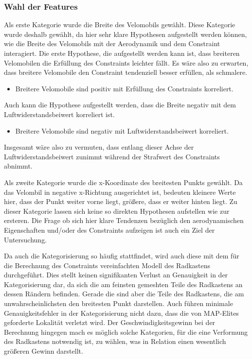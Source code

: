 \subsubsection{Wahl der Features}

Als erste Kategorie wurde die Breite des Velomobils gewählt.
Diese Kategorie wurde deshalb gewählt, da hier sehr klare Hypothesen aufgestellt werden können, wie die Breite des Velomobils mit der Aerodynamik und dem Constraint interagiert.
Die erste Hypothese, die aufgestellt werden kann ist, dass breiteren Velomobilen die Erfüllung des Constraints leichter fällt. Es wäre also zu erwarten, dass breitere Velomobile den Constraint tendenziell besser erfüllen, als schmalere.
\begin{itemize}
	\item Breitere Velomobile sind positiv mit Erfüllung des Constraints korreliert.
\end{itemize}
Auch kann die Hypothese aufgestellt werden, dass die Breite negativ mit dem Luftwiderstandsbeiwert korreliert ist.
\begin{itemize}
	\item Breitere Velomobile sind negativ mit Luftwiderstandsbeiwert korreliert.
\end{itemize}
Insgesamt wäre also zu vermuten, dass entlang dieser Achse der Luftwiderstandsbeiwert zunimmt während der Strafwert des Constraints abnimmt.

Als zweite Kategorie wurde die x-Koordinate des breitesten Punkts gewählt.
Da das Velombil in negative x-Richtung ausgerichtet ist, bedeuten kleinere Werte hier, dass der Punkt weiter vorne liegt, größere, dass er weiter hinten liegt.
Zu dieser Kategorie lassen sich keine so direkten Hypothesen aufstellen wie zur ersteren.
Die Frage ob sich hier klare Tendenzen bezüglich den aerodynamischen Eigenschaften und/oder des Constraints aufzeigen ist auch ein Ziel der Untersuchung.

Da auch die Kategorisierung so häufig stattfindet, wird auch diese mit dem für die Berechnung des Constraints vereinfachten Modell des Radkastens durchgeführt. 
Dies stellt keinen signifikanten Verlust an Genauigkeit in der Kategorisierung dar, da sich die am feinsten gemeshten Teile des Radkastens an dessen Rändern befinden.
Gerade die sind aber die Teile des Radkastens, die am unwahrscheinlichsten den breitesten Punkt darstellen.
Auch führen minimale Genauigkeitsfehler in der Kategorisierung nicht dazu, dass die von MAP-Elites geforderte Lokalität verletzt wird.
Der Geschwindigkeitsgewinn bei der Berechnung hingegen mach es möglich solche Kategorien, für die eine Verformung des Radkastens notwendig ist, zu wählen, was in Relation einen wesentlich größeren Gewinn darstellt.

